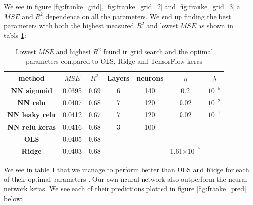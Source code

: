 \documentclass[11pt]{article}
\begin{document}
We see in figure \ref{fig:franke_grid}, \ref{fig:franke_grid_2} and \ref{fig:franke_grid_3} a $MSE$ and $R^2$ dependence on all the parameters. We end up finding the best parameters with both the highest measured $R^2$ and lowest $MSE$ as shown in table \ref{tab:franke_best}:
\begin{table}[H]
    \centering
    \caption{Lowest $MSE$ and highest $R^2$ found in grid search and the optimal parameters compared to OLS, Ridge and TensorFlow keras}
    \label{tab:franke_best}
    \begin{tabular}{|c|c|c|c|c|c|c|}
        \hline
        method                 & $MSE$  & $R^2$ & Layers & neurons & $\eta$                & $\lambda$ \\
        \hline
        \textbf{NN sigmoid}    & 0.0395 & 0.69  & 6      & 140     & 0.2                   & $10^{-5}$ \\\hline
        \textbf{NN relu}       & 0.0407 & 0.68  & 7      & 120     & 0.02                  & $10^{-2}$ \\\hline
        \textbf{NN leaky relu} & 0.0412 & 0.67  & 7      & 120     & 0.02                  & $10^{-1}$ \\\hline
        \textbf{NN relu keras} & 0.0416 & 0.68  & 3      & 100     & -                     & -         \\\hline
        \textbf{OLS}           & 0.0405 & 0.68  & -      & -       & -                     & -         \\\hline
        \textbf{Ridge}         & 0.0403 & 0.68  & -      & -       & 1.61$\times 10 ^{-7}$ & -         \\
        \hline
    \end{tabular}
\end{table}
We see in table \ref{tab:franke_best} that we manage to perform better than OLS and Ridge for each of their optimal parameters \cite{project1}. Our own neural network also outperform the neural network keras. We see each of their predictions plotted in figure \ref{fig:franke_pred} below:
\end{document}
